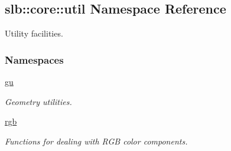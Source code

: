 \hypertarget{namespaceslb_1_1core_1_1util}{}\subsection{slb\+:\+:core\+:\+:util Namespace Reference}
\label{namespaceslb_1_1core_1_1util}


Utility facilities.  


\subsubsection*{Namespaces}
\begin{DoxyCompactItemize}
\item 
 \hyperlink{namespaceslb_1_1core_1_1util_1_1gu}{gu}
\begin{DoxyCompactList}\small\item\em Geometry utilities. \end{DoxyCompactList}\item 
 \hyperlink{namespaceslb_1_1core_1_1util_1_1rgb}{rgb}
\begin{DoxyCompactList}\small\item\em Functions for dealing with R\+GB color components. \end{DoxyCompactList}\end{DoxyCompactItemize}
